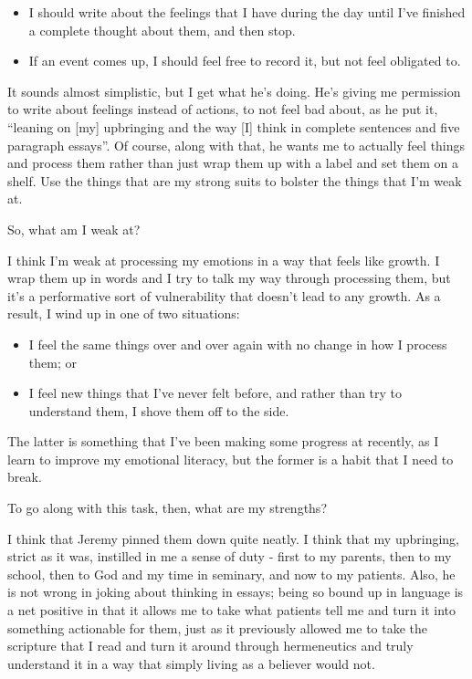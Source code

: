 \begin{itemize}
\tightlist
\item
  I should write about the feelings that I have during the day until I've finished a complete thought about them, and then stop.
\item
  If an event comes up, I should feel free to record it, but not feel obligated to.
\end{itemize}

It sounds almost simplistic, but I get what he's doing. He's giving me permission to write about feelings instead of actions, to not feel bad about, as he put it, ``leaning on {[}my{]} upbringing and the way {[}I{]} think in complete sentences and five paragraph essays''. Of course, along with that, he wants me to actually feel things and process them rather than just wrap them up with a label and set them on a shelf. Use the things that are my strong suits to bolster the things that I'm weak at.

So, what am I weak at?

I think I'm weak at processing my emotions in a way that feels like growth. I wrap them up in words and I try to talk my way through processing them, but it's a performative sort of vulnerability that doesn't lead to any growth. As a result, I wind up in one of two situations:

\begin{itemize}
\tightlist
\item
  I feel the same things over and over again with no change in how I process them; or
\item
  I feel new things that I've never felt before, and rather than try to understand them, I shove them off to the side.
\end{itemize}

The latter is something that I've been making some progress at recently, as I learn to improve my emotional literacy, but the former is a habit that I need to break.

To go along with this task, then, what are my strengths?

I think that Jeremy pinned them down quite neatly. I think that my upbringing, strict as it was, instilled in me a sense of duty - first to my parents, then to my school, then to God and my time in seminary, and now to my patients. Also, he is not wrong in joking about thinking in essays; being so bound up in language is a net positive in that it allows me to take what patients tell me and turn it into something actionable for them, just as it previously allowed me to take the scripture that I read and turn it around through hermeneutics and truly understand it in a way that simply living as a believer would not.

